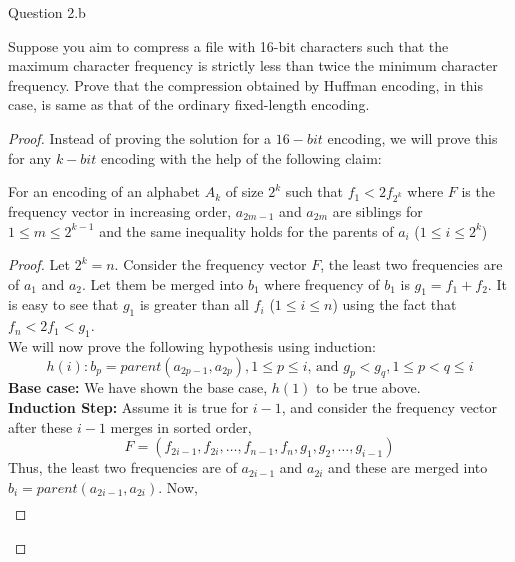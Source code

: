 \begin{solution}{Question 2.b}
    \begin{question}
        Suppose you aim to compress a file with 16-bit characters such that the maximum character frequency is strictly less than twice the minimum character frequency. Prove that the compression obtained by Huffman encoding, in this case, is same as that of the ordinary fixed-length encoding.
    \end{question}
    \tcblower{}
    \begin{proof}
        Instead of proving the solution for a $16-bit$ encoding, we will prove this for any $k-bit$ encoding with the help of the following claim:
        \begin{claim}\label{claim:constproperty}
            For an encoding of an alphabet $A_k$ of size $2^k$ such that $f_1<2f_{2^k}$ where $F$ is the frequency vector in increasing order, $a_{2m-1}$ and $a_{2m}$ are siblings for $1\leq m\leq 2^{k-1}$ and the same inequality holds for the parents of $a_i$ ($1\leq i\leq 2^k$)
        \end{claim}
        \begin{proof}
            Let $2^k=n$. Consider the frequency vector $F$, the least two frequencies are of $a_1$ and $a_2$. Let them be merged into $b_1$ where frequency of $b_1$ is $g_1=f_1+f_2$. It is easy to see that $g_1$ is greater than all $f_i$ ($1\leq i\leq n$) using the fact that $f_n<2f_1<g_1$.\\
            We will now prove the following hypothesis using induction:
            \begin{equation}
                h(i): b_p=parent(a_{2p-1}, a_{2p}), 1\leq p\leq i\text{, and }g_p<g_q, 1\leq p<q\leq i
            \end{equation}
            \textbf{Base case:} We have shown the base case, $h(1)$ to be true above.\\
            \textbf{Induction Step:} Assume it is true for $i-1$, and consider the frequency vector after these $i-1$ merges in sorted order,
            \begin{equation}
                F=(f_{2i-1}, f_{2i}, \ldots, f_{n-1}, f_{n}, g_1, g_2, \ldots, g_{i-1})
            \end{equation}
            Thus, the least two frequencies are of $a_{2i-1}$ and $a_{2i}$ and these are merged into $b_i=parent(a_{2i-1}, a_{2i})$. Now,
            \begin{equation}
                \begin{split}

\end{split}
\end{equation}
\end{proof}
\end{proof}
\end{solution}
